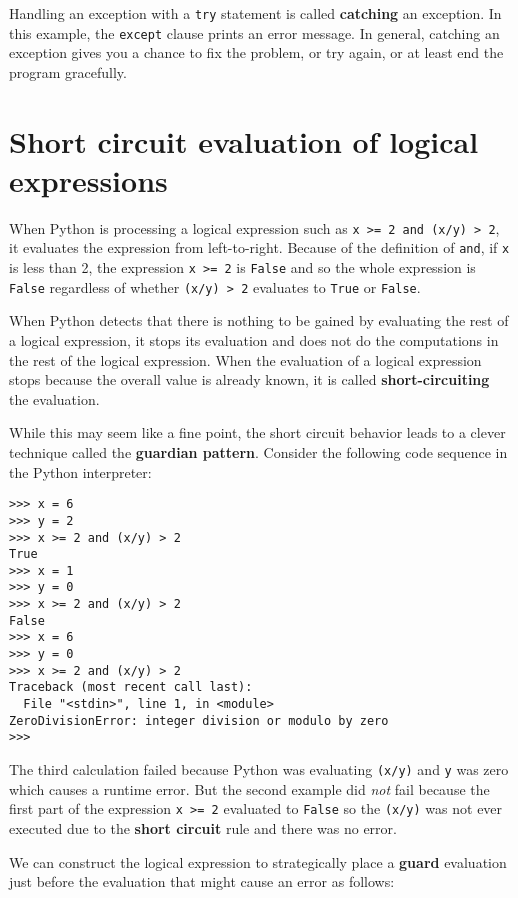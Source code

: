 Handling an exception with a {\tt try} statement is called {\bf
catching} an exception.  In this example, the {\tt except} clause
prints an error message.  In general,
catching an exception gives you a chance to fix the problem, or try
again, or at least end the program gracefully.

\section{Short circuit evaluation of logical expressions}

When Python is processing a logical expression such as 
{\tt x >= 2 and (x/y) > 2}, it evaluates the expression
from left-to-right.  Because of the definition of {\tt and},
if {\tt x} is less than 2, the expression {\tt x >= 2} is 
{\tt False} and so the whole expression is {\tt False} regardless
of whether {\tt (x/y) > 2} evaluates to {\tt True} or {\tt False}.

When Python detects that there is nothing to be gained by evaluating
the rest of a logical expression, it stops its evaluation and does
not do the computations in the rest of the logical expression.  
When the evaluation of a logical expression stops because the overall
value is already known, it is called {\bf short-circuiting} 
the evaluation.

While this may seem like a fine point, the short circuit behavior
leads to a clever technique called the {\bf guardian pattern}.  
Consider the following code sequence in the Python interpreter:

\beforeverb
\begin{verbatim}
>>> x = 6 
>>> y = 2
>>> x >= 2 and (x/y) > 2
True
>>> x = 1 
>>> y = 0
>>> x >= 2 and (x/y) > 2
False
>>> x = 6
>>> y = 0
>>> x >= 2 and (x/y) > 2
Traceback (most recent call last):
  File "<stdin>", line 1, in <module>
ZeroDivisionError: integer division or modulo by zero
>>> 
\end{verbatim}
\afterverb
%
The third calculation failed because Python was evaluating {\tt (x/y)}
and {\tt y} was zero which causes a runtime error.  But the second example
did \emph{not} fail because the first part of the expression {\tt x >= 2} 
evaluated to {\tt False} so the {\tt (x/y)} was not ever executed 
due to the {\bf short circuit} rule and there was no error.

We can construct the logical expression to strategically place a {\bf guard}
evaluation just before the evaluation that might cause an error as follows:

